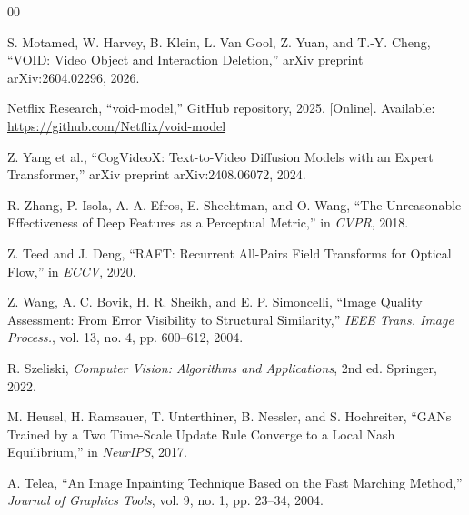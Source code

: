 \documentclass[conference]{IEEEtran}
\begin{document}
\begin{thebibliography}{00}

S. Motamed, W. Harvey, B. Klein, L. Van Gool, Z. Yuan, and T.-Y. Cheng,
``VOID: Video Object and Interaction Deletion,''
arXiv preprint arXiv:2604.02296, 2026.

Netflix Research,
``void-model,''
GitHub repository, 2025.
[Online]. Available: \url{https://github.com/Netflix/void-model}

Z. Yang et al.,
``CogVideoX: Text-to-Video Diffusion Models with an Expert Transformer,''
arXiv preprint arXiv:2408.06072, 2024.

R. Zhang, P. Isola, A. A. Efros, E. Shechtman, and O. Wang,
``The Unreasonable Effectiveness of Deep Features as a Perceptual Metric,''
in \textit{CVPR}, 2018.

Z. Teed and J. Deng,
``RAFT: Recurrent All-Pairs Field Transforms for Optical Flow,''
in \textit{ECCV}, 2020.

Z. Wang, A. C. Bovik, H. R. Sheikh, and E. P. Simoncelli,
``Image Quality Assessment: From Error Visibility to Structural Similarity,''
\textit{IEEE Trans. Image Process.}, vol. 13, no. 4, pp. 600--612, 2004.

R. Szeliski,
\textit{Computer Vision: Algorithms and Applications}, 2nd ed.
Springer, 2022.

M. Heusel, H. Ramsauer, T. Unterthiner, B. Nessler, and S. Hochreiter,
``GANs Trained by a Two Time-Scale Update Rule Converge to a Local Nash Equilibrium,''
in \textit{NeurIPS}, 2017.

A. Telea,
``An Image Inpainting Technique Based on the Fast Marching Method,''
\textit{Journal of Graphics Tools}, vol. 9, no. 1, pp. 23--34, 2004.

\end{thebibliography}
\end{document}
